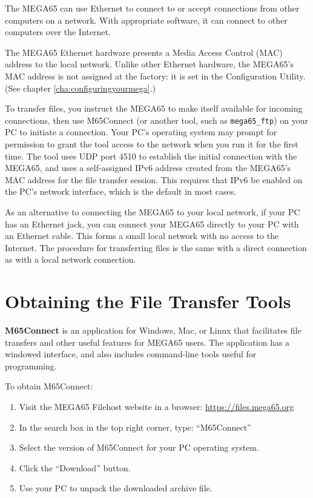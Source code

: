 The MEGA65 can use Ethernet to connect to or accept connections from other computers on a network. With appropriate software, it can connect to other computers over the Internet.

The MEGA65 Ethernet hardware presents a Media Access Control (MAC) address to the local network. Unlike other Ethernet hardware, the MEGA65's MAC address is not assigned at the factory: it is set in the Configuration Utility. (See chapter \vref{cha:configuringyourmega}.)

To transfer files, you instruct the MEGA65 to make itself available for incoming connections, then use M65Connect (or another tool, such as \texttt{mega65\_ftp}) on your PC to initiate a connection. Your PC's operating system may prompt for permission to grant the tool access to the network when you run it for the first time. The tool uses UDP port 4510 to establish the initial connection with the MEGA65, and uses a self-assigned IPv6 address created from the MEGA65's MAC address for the file transfer session. This requires that IPv6 be enabled on the PC's network interface, which is the default in most cases.

As an alternative to connecting the MEGA65 to your local network, if your PC has an Ethernet jack, you can connect your MEGA65 directly to your PC with an Ethernet cable. This forms a small local network with no access to the Internet. The procedure for transferring files is the same with a direct connection as with a local network connection.

\section{Obtaining the File Transfer Tools}

{\bf M65Connect} is an application for Windows, Mac, or Linux that facilitates file transfers and other useful features for MEGA65 users. The application has a windowed interface, and also includes command-line tools useful for programming.

To obtain M65Connect:

\begin{enumerate}
\item Visit the MEGA65 Filehost website in a browser: \url{https://files.mega65.org}
\item In the search box in the top right corner, type: ``M65Connect''
\item Select the version of M65Connect for your PC operating system.
\item Click the ``Download'' button.
\item Use your PC to unpack the downloaded archive file.
\end{enumerate}

